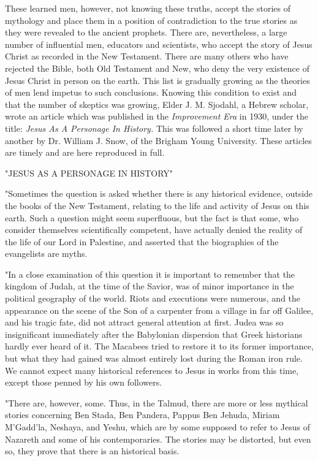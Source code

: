 These learned men, however, not knowing these truths, accept the stories of mythology and
place them in a position of contradiction to the true stories as they were revealed to the
ancient prophets. There are, nevertheless, a large number of influential men, educators and
scientists, who accept the story of Jesus Christ as recorded in the New Testament. There are
many others who have rejected the Bible, both Old Testament and New, who deny the very
existence of Jesus Christ in person on the earth. This list is gradually growing as the theories
of men lend impetus to such conclusions. Knowing this condition to exist and that the
number of skeptics was growing, Elder J. M. Sjodahl, a Hebrew scholar, wrote an article
which was published in the \textit{Improvement Era} in 1930, under the title: \textit{Jesus As A Personage
In History.} This was followed a short time later by another by Dr. William J. Snow, of the
Brigham Young University. These articles are timely and are here reproduced in full.

"JESUS AS A PERSONAGE IN HISTORY"

"Sometimes the question is asked whether there is any historical evidence, outside the books
of the New Testament, relating to the life and activity of Jesus on this earth. Such a question
might seem superfluous, but the fact is that some, who consider themselves scientifically
competent, have actually denied the reality of the life of our Lord in Palestine, and asserted
that the biographies of the evangelists are myths.

"In a close examination of this question it is important to remember that the kingdom of
Judah, at the time of the Savior, was of minor importance in the political geography of the
world. Riots and executions were numerous, and the appearance on the scene of the Son of a
carpenter from a village in far off Galilee, and his tragic fate, did not attract general attention
at first. Judea was so insignificant immediately after the Babylonian dispersion that Greek
historians hardly ever heard of it. The Macabees tried to restore it to its former importance,
but what they had gained was almost entirely lost during the Roman iron rule. We cannot
expect many historical references to Jesus in works from this time, except those penned by
his own followers.

"There are, however, some. Thus, in the Talmud, there are more or less mythical stories
concerning Ben Stada, Ben Pandera, Pappus Ben Jehuda, Miriam M'Gadd'la, Neshaya, and
Yeshu, which are by some supposed to refer to Jesus of Nazareth and some of his
contemporaries. The stories may be distorted, but even so, they prove that there is an
historical basis.

